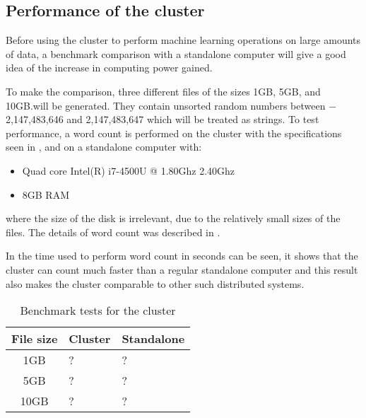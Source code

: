 \subsection{Performance of the cluster}\label{sec:benchmark}
Before using the cluster to perform machine learning operations on large amounts of data, a benchmark comparison with a standalone computer will give a good idea of the increase in computing power gained.

To make the comparison, three different files of the sizes 1GB, 5GB, and 10GB.\@ will be generated. They contain unsorted random numbers between $-$2,147,483,646 and 2,147,483,647 which will be treated as strings. To test performance, a word count is performed on the cluster with the specifications seen in , and on a standalone computer with:
\begin{itemize}
\item Quad core Intel(R) i7-4500U @ 1.80Ghz 2.40Ghz
\item 8GB RAM
\end{itemize}
where the size of the disk is irrelevant, due to the relatively small sizes of the files. The details of word count was described in .

In  the time used to perform word count in seconds can be seen, it shows that the cluster can count much faster than a regular standalone computer and this result also makes the cluster comparable to other such distributed systems.

\begin{table}[!htb]
  \centering
  \begin{tabular}{|c|ll|}
    \hline
    File size & Cluster  & Standalone \\
    \hline
    1GB & ? & ? \\
    5GB & ? & ? \\
    10GB & ? & ? \\
    \hline
  \end{tabular}
  \caption{Benchmark tests for the cluster}
  \label{tab:bench}
\end{table}

